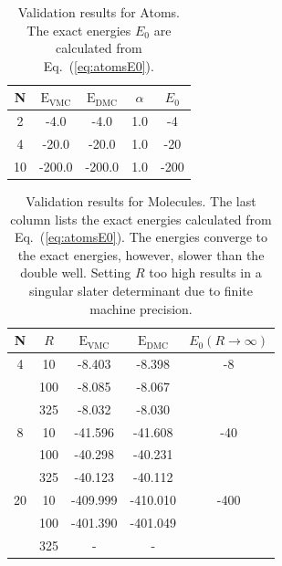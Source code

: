 \setlength{\tabcolsep}{1cm}
\begin{table}
\begin{center}
\begin{tabular}{c|cccc}
    N     & $\mathrm{E_{VMC}}$ & $\mathrm{E_{DMC}}$ & $\alpha$ & $E_0$\\
\hline
    2     &   -4.0   &   -4.0   &   1.0  & -4  \\
    4     &  -20.0   &  -20.0   &   1.0  & -20 \\
    10    &  -200.0  &  -200.0  &   1.0  & -200\\
\end{tabular}
\caption{Validation results for Atoms. The exact energies $E_0$ are calculated from Eq.~(\ref{eq:atomsE0}).}
\label{tab:res_valid_atoms}
\end{center}
\end{table}
\setlength{\tabcolsep}{6pt}

\setlength{\tabcolsep}{0.8cm}
\begin{table}
\begin{center}
\begin{tabular}{c|cccc}
    N     & $R$ & $\mathrm{E_{VMC}}$ & $\mathrm{E_{DMC}}$ & $E_0(R\to\infty)$\\
\hline
    4     & 10  &   -8.403     &  -8.398    & -8  \\
          & 100 &   -8.085     &  -8.067    &     \\
          & 325 &   -8.032     &  -8.030    &     \\
    8     & 10  &  -41.596     &  -41.608   & -40 \\
          & 100 &  -40.298     &  -40.231   &     \\
          & 325 &  -40.123     &  -40.112   &     \\
    20    & 10  &  -409.999    &  -410.010  & -400\\
          & 100 &  -401.390    &  -401.049  &     \\
          & 325 &  -           &  -         &     \\
\end{tabular}
\caption{Validation results for Molecules. The last column lists the exact energies calculated from Eq.~(\ref{eq:atomsE0}). The energies converge to the exact energies, however, slower than the double well. Setting $R$ too high results in a singular slater determinant due to finite machine precision.}
\label{tab:res_valid_molecules}
\end{center}
\end{table}
\setlength{\tabcolsep}{6pt}


